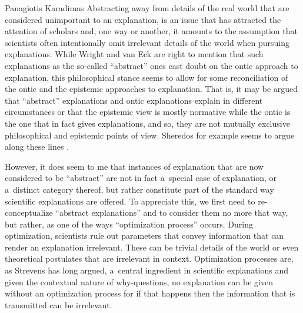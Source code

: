 \begin{artengenv}{Panagiotis Karadimas}
Abstracting away from details of the real world that are considered unimportant to an explanation, is an issue that has attracted the attention of scholars and, one way or another, it amounts to the assumption that scientists often intentionally omit irrelevant details of the world when pursuing explanations. While Wright and van Eck are right to mention that such explanations as the so-called ``abstract'' ones cast doubt on the ontic approach to explanation, this philosophical stance seems to allow for some reconciliation of the ontic and the epistemic approaches to explanation. That is, it may be argued that ``abstract'' explanations and ontic explanations explain in different circumstances or that the epistemic view is mostly normative while the ontic is the one that in fact gives explanations, and so, they are not mutually exclusive philosophical and epistemic points of view. Sheredos for example seems to argue along these lines
\parencites[][]{sheredos_re-reconciling_2016}[][]{sheredos_re-re-reconciling_2019}.%


However, it does seem to me that instances of explanation that are now considered to be ``abstract'' are not in fact a~special case of explanation, or a~distinct category thereof, but rather constitute part of the standard way scientific explanations are offered. To appreciate this, we first need to re-conceptualize ``abstract explanations'' and to consider them no more that way, but rather, as one of the ways ``optimization process'' occurs. During optimization, scientists rule out parameters that convey information that can render an explanation irrelevant. These can be trivial details of the world or even theoretical postulates that are irrelevant in context. Optimization processes are, as Strevens has long argued, a~central ingredient in scientific explanations and given the contextual nature of why-questions, no explanation can be given without an optimization process for if that happens then the information that is transmitted can be irrelevant.


\end{artengenv}

